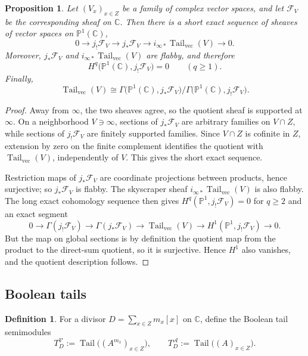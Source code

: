 \documentclass[11pt,a4paper]{article}
\newtheorem{proposition}[theorem]{Proposition}
\theoremstyle{definition}
\newtheorem{definition}[theorem]{Definition}
\theoremstyle{remark}
\DeclareMathOperator{\Tail}{Tail}
\newcommand{\CC}{\mathbb C}
\newcommand{\PP}{\mathbb P}
\newcommand{\cV}{\mathcal V}
\newcommand{\cA}{\mathcal A}
\begin{document}
\begin{proposition}\label{prop:vector-tail-exact}
Let $(V_x)_{x\in Z}$ be a family of complex vector spaces, and let $\mathcal F_V$ be the corresponding sheaf on $\CC$.  Then there is a short exact sequence of sheaves of vector spaces on $\PP^1(\CC)$,
\[
0\longrightarrow j_!\mathcal F_V
\longrightarrow j_*\mathcal F_V
\longrightarrow i_{\infty*}\Tail_{\mathrm{vec}}(V)
\longrightarrow 0.
\]
Moreover, $j_*\mathcal F_V$ and $i_{\infty*}\Tail_{\mathrm{vec}}(V)$ are flabby, and therefore
\[
H^q\bigl(\PP^1(\CC),j_!\mathcal F_V\bigr)=0\qquad(q\ge1).
\]
Finally,
\[
\Tail_{\mathrm{vec}}(V)
\cong
\Gamma\bigl(\PP^1(\CC),j_*\mathcal F_V\bigr)\Big/\Gamma\bigl(\PP^1(\CC),j_!\mathcal F_V\bigr).
\]
\end{proposition}

\begin{proof}
Away from $\infty$, the two sheaves agree, so the quotient sheaf is supported at $\infty$.  On a neighborhood $V\ni\infty$, sections of $j_*\mathcal F_V$ are arbitrary families on $V\cap Z$, while sections of $j_!\mathcal F_V$ are finitely supported families.  Since $V\cap Z$ is cofinite in $Z$, extension by zero on the finite complement identifies the quotient with $\Tail_{\mathrm{vec}}(V)$, independently of $V$.  This gives the short exact sequence.

Restriction maps of $j_*\mathcal F_V$ are coordinate projections between products, hence surjective; so $j_*\mathcal F_V$ is flabby.  The skyscraper sheaf $i_{\infty*}\Tail_{\mathrm{vec}}(V)$ is also flabby.  The long exact cohomology sequence then gives $H^q(\PP^1,j_!\mathcal F_V)=0$ for $q\ge2$ and an exact segment
\[
0\to \Gamma(j_!\mathcal F_V)\to \Gamma(j_*\mathcal F_V)\to \Tail_{\mathrm{vec}}(V)
\to H^1(\PP^1,j_!\mathcal F_V)\to 0.
\]
But the map on global sections is by definition the quotient map from the product to the direct-sum quotient, so it is surjective.  Hence $H^1$ also vanishes, and the quotient description follows.
\end{proof}

\subsection{Boolean tails}

\begin{definition}
For a divisor $D=\sum_{x\in Z}m_x[x]$ on $\CC$, define the Boolean tail semimodules
\[
T_D^{\cV}:=\Tail\bigl((A^{m_x})_{x\in Z}\bigr),
\qquad
T_D^{\cA}:=\Tail\bigl((A)_{x\in Z}\bigr).
\]
\end{definition}
\end{document}

